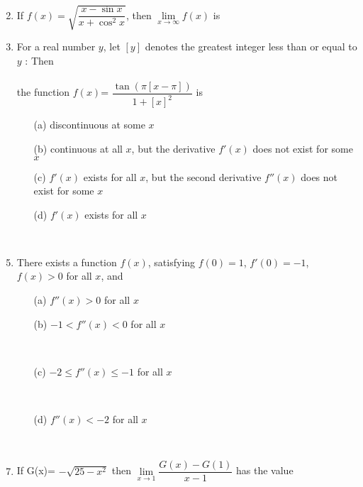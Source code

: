 \documentclass[journal,12pt,twocolumn]{IEEEtran}
\begin{document}
\begin{enumerate}
\item[~] \item If $f(x)=\sqrt{\dfrac{x-\sin x}{x+\cos^2x}}$, then $\lim\limits_{x \to \infty}f(x)$ is
\begin{itemize}
\end{itemize}

\item For a real number $y$, let $\left[y\right]$ denotes the greatest integer less than or equal to $y$ : Then \\ \\the function $f(x)$= $\dfrac{\tan\left(\pi\left[x-\pi\right]\right)}{1+\left[x\right]^2}$ is \\
\begin{itemize}
\item[(a)] discontinuous at some $x$
\item[(b)] continuous at all $x$, but the derivative $f'(x)$ does not exist for some $x$
\item[(c)] $f'(x)$ exists for all $x$, but the second derivative $f''(x)$ does not exist for some $x$
\item[(d)] $f'(x)$ exists for all $x$
\end{itemize}

\item[~] \item There exists a function $f(x)$, satisfying $f(0)=1$, $f'(0)=-1$, $f(x)>0$ for all $x$, and
\begin{itemize}
\item[(a)] $f''(x)>0$ for all $x$\\ \item[(b)] $-1<f''(x)<0$ for all $x$ \item[~]\item[(c)] $-2\leq f''(x)\leq -1$ for all $x$ \item[~] \item[(d)] $f''(x)<-2$ for all $x$
\end{itemize}

\item[~] \item If G(x)= $-\sqrt{25-x^2}$ then $\lim\limits_{x \to 1}\dfrac{G(x)-G(1)}{x-1}$ has the value
\begin{itemize}
\end{itemize}


\end{enumerate}
\end{document}
